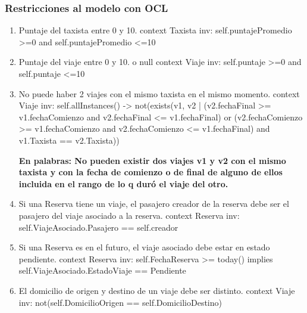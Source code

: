\subsubsection{Restricciones al modelo con OCL}
\begin{enumerate}
	\item \begin{ocl}{Puntaje del taxista entre 0 y 10.}
		  context Taxista
		  inv: self.puntajePromedio >=0 and
		       self.puntajePromedio <=10
		\end{ocl}
	
	\item \begin{ocl}{Puntaje del viaje entre 0 y 10. o null}
		  context Viaje
		  inv: self.puntaje >=0 and
		       self.puntaje <=10
		\end{ocl}

	\item \begin{ocl}{No puede haber 2 viajes con el mismo taxista en el mismo momento.}
		  context Viaje
		  inv: self.allInstances() -> not(exists(v1, v2 | 
		     (v2.fechaFinal >= v1.fechaComienzo and v2.fechaFinal <= v1.fechaFinal) or 
		     (v2.fechaComienzo >= v1.fechaComienzo and v2.fechaComienzo <= v1.fechaFinal)
		     and v1.Taxista == v2.Taxista))
		\end{ocl}
		\textbf{En palabras: No pueden existir dos viajes v1 y v2 con el mismo taxista y con la fecha de comienzo o de final de alguno de ellos incluida en el rango de lo q duró el viaje del otro.}

	\item \begin{ocl}{Si una Reserva tiene un viaje, el pasajero creador de la reserva debe ser el pasajero del viaje asociado a la reserva.}
		  context Reserva
		  inv: self.ViajeAsociado.Pasajero == self.creador
		\end{ocl}

	\item \begin{ocl}{Si una Reserva es en el futuro, el viaje asociado debe estar en estado pendiente.}
		  context Reserva
		  inv: self.FechaReserva >= today() implies self.ViajeAsociado.EstadoViaje == Pendiente
		\end{ocl}

	\item \begin{ocl}{El domicilio de origen y destino de un viaje debe ser distinto.}
		  context Viaje
		  inv: not(self.DomicilioOrigen == self.DomicilioDestino)
		\end{ocl}


\end{enumerate}
